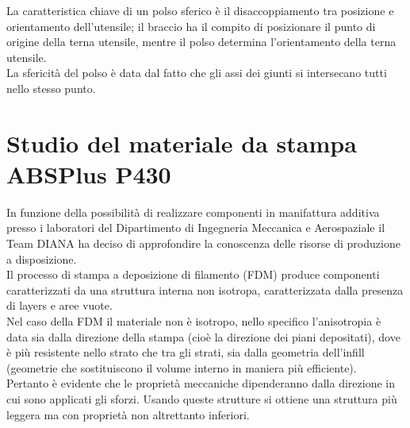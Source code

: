 \documentclass[%
corpo=11pt,
twoside,
 stile=classica,
oldstyle,
greek,%
]{toptesi}
\begin{document}
	La caratteristica chiave di un polso sferico è il disaccoppiamento tra posizione e orientamento dell'utensile; il braccio ha il compito di posizionare il punto di origine della terna utensile, mentre il polso determina l'orientamento della terna utensile.\\
	La sfericità del polso è data dal fatto che gli assi dei giunti si intersecano tutti nello stesso punto.
	
	
	\section{Studio del materiale da stampa ABSPlus P430}
	In funzione della possibilità di realizzare componenti in manifattura additiva presso i laboratori  del Dipartimento di Ingegneria Meccanica e Aerospaziale il Team DIANA ha deciso di approfondire la conoscenza delle risorse di produzione a disposizione. \\
	Il processo di stampa a deposizione di filamento (FDM) produce componenti caratterizzati da una struttura interna non isotropa, caratterizzata dalla presenza di layers e aree vuote.\\ 
	Nel caso della FDM il materiale non è isotropo, nello specifico l’anisotropia è data sia dalla direzione della stampa (cioè la direzione dei piani depositati), dove è più resistente nello strato che tra gli strati, sia dalla geometria dell’infill (geometrie che sostituiscono il volume interno in maniera più efficiente).\\
	 Pertanto è evidente che le proprietà meccaniche dipenderanno dalla direzione in cui sono applicati gli sforzi. 
	 Usando queste strutture si ottiene una struttura più leggera ma con proprietà non altrettanto inferiori. 
	 
\end{document}
